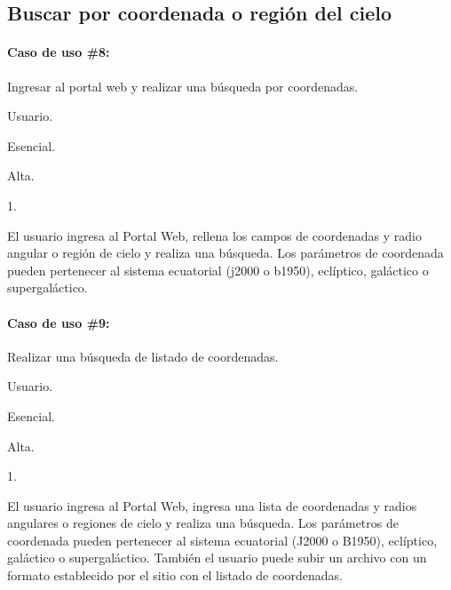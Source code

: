 \subsection*{Buscar por coordenada o región del cielo}

\paragraph{Caso de uso \#8:}

\begin{description}[noitemsep]
        \item[Objetivo] Ingresar al portal web y realizar una búsqueda por coordenadas.
        \item[Actor] Usuario.
        \item[Necesidad] Esencial.
        \item[Prioridad] Alta.
        \item[Requerimientos Referenciados] 1.
	\item[Descripción] El usuario ingresa al Portal Web, rellena los campos de coordenadas y radio angular o región de cielo y realiza una búsqueda. Los parámetros de coordenada pueden pertenecer al sistema ecuatorial (\gls{j2000} o \gls{b1950}), eclíptico, galáctico o supergaláctico.
\end{description}

\paragraph{Caso de uso \#9:}

\begin{description}[noitemsep]
        \item[Objetivo] Realizar una búsqueda de listado de coordenadas.
        \item[Actor] Usuario.
        \item[Necesidad] Esencial.
        \item[Prioridad] Alta.
        \item[Requerimientos Referenciados] 1.
        \item[Descripción] El usuario ingresa al Portal Web, ingresa una lista de coordenadas y radios angulares o regiones de cielo y realiza una búsqueda. Los parámetros de coordenada pueden pertenecer al sistema ecuatorial (J2000 o B1950), eclíptico, galáctico o supergaláctico. También el usuario puede subir un archivo con un formato establecido por el sitio con el listado de coordenadas.
\end{description}


